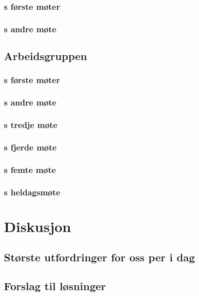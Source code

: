 \documentclass[11pt]{report} %
\begin{document}
    \subsection{s første møter}\label{sec:stygr_1}
    \subsection{s andre møte}\label{sec:stygr_2}
  \section{Arbeidsgruppen}\label{sec:m_agr}
    \subsection{s første møter}\label{sec:agr_1}
    \subsection{s andre møte}\label{sec:agr_2}
    \subsection{s tredje møte}\label{sec:agr_3}
    \subsection{s fjerde møte}\label{sec:agr_4}
    \subsection{s femte møte}\label{sec:agr_5}
    \subsection{s heldagsmøte}\label{sec:agr_6}
      

\chapter{Diskusjon}\label{chap:disk}
  \section{Største utfordringer for oss per i dag} \label{chap:disk_utf}

  \section{Forslag til løsninger}\label{chap:disk_losn}
\end{document}
